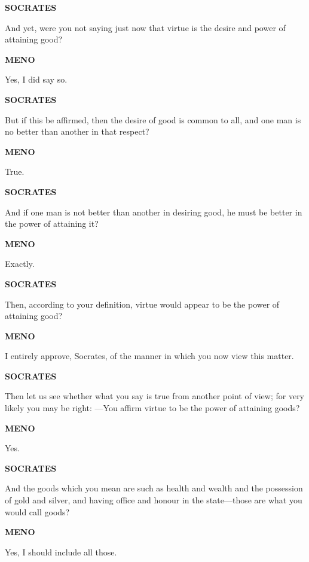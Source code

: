 \documentclass[11pt,letter]{article}
\begin{document}
\par \textbf{SOCRATES}
\par   And yet, were you not saying just now that virtue is the desire and power of attaining good?

\par \textbf{MENO}
\par   Yes, I did say so.

\par \textbf{SOCRATES}
\par   But if this be affirmed, then the desire of good is common to all, and one man is no better than another in that respect?

\par \textbf{MENO}
\par   True.

\par \textbf{SOCRATES}
\par   And if one man is not better than another in desiring good, he must be better in the power of attaining it?

\par \textbf{MENO}
\par   Exactly.

\par \textbf{SOCRATES}
\par   Then, according to your definition, virtue would appear to be the power of attaining good?

\par \textbf{MENO}
\par   I entirely approve, Socrates, of the manner in which you now view this matter.

\par \textbf{SOCRATES}
\par   Then let us see whether what you say is true from another point of view; for very likely you may be right: —You affirm virtue to be the power of attaining goods?

\par \textbf{MENO}
\par   Yes.

\par \textbf{SOCRATES}
\par   And the goods which you mean are such as health and wealth and the possession of gold and silver, and having office and honour in the state—those are what you would call goods?

\par \textbf{MENO}
\par   Yes, I should include all those.
\end{document}
